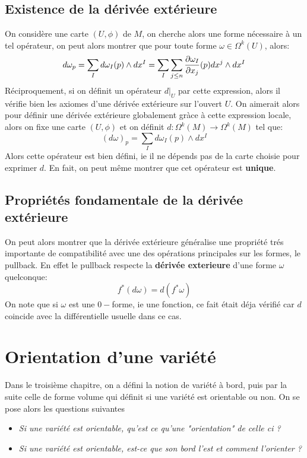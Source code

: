    \pagebreak
   \section{Existence de la dérivée extérieure}
      On considère une carte \( (U, \phi) \) de \( M \), on cherche alors une forme nécessaire à un tel opérateur, on peut alors montrer que pour toute forme \( \omega \in \Omega^k(U) \), alors:
      \[ 
         d\omega_p = \sum_I d\omega_I(p) \wedge dx^I = \sum_I \sum_{j \leq n} \frac{\partial \omega_I}{\partial x_j}(p) dx^j \wedge dx^I
      \]
      Réciproquement, si on définit un opérateur \( d|_U \) par cette expression, alors il vérifie bien les axiomes d'une dérivée extérieure sur l'ouvert \( U \). On aimerait alors pour définir une dérivée extérieure globalement gràce à cette expression locale, alors on fixe une carte \( (U, \phi) \) et on définit \( d : \Omega^k(M) \longrightarrow \Omega^k(M) \) tel que:
      \[ 
         (d\omega)_p = \sum_I d\omega_I(p) \wedge dx^I
      \]
      Alors cette opérateur est bien défini, ie il ne dépends pas de la carte choisie pour exprimer \( d \). En fait, on peut même montrer que cet opérateur est \textbf{unique}.   
   \section{Propriétés fondamentale de la dérivée extérieure}
      On peut alors montrer que la dérivée extérieure généralise une propriété trés importante de compatibilité avec une des opérations principales sur les formes, le pullback. En effet le pullback respecte la \textbf{dérivée exterieure} d'une forme \( \omega \) quelconque:
      \[ 
         f^*(d\omega) = d(f^*\omega)
      \]
      On note que si \( \omega \) est une \( 0-\)forme, ie une fonction, ce fait était déja vérifié car \( d \) coincide avec la différentielle usuelle dans ce cas.

\chapter{Orientation d'une variété}
   Dans le troisième chapitre, on a défini la notion de variété à bord, puis par la suite celle de forme volume qui définit si une variété est orientable ou non. On se pose alors les questions suivantes
   \begin{itemize}
      \item \textit{Si une variété est orientable, qu'est ce qu'une "orientation" de celle ci ?}
      \item \textit{Si une variété est orientable, est-ce que son bord l'est et comment l'orienter ?}
   \end{itemize}
